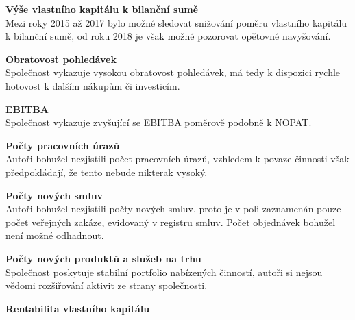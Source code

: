 \noindent\textbf{Výše vlastního kapitálu k bilanční sumě}\\

Mezi roky 2015 až 2017 bylo možné sledovat snižování poměru vlastního kapitálu k bilanční sumě, od roku 2018 je však možné pozorovat opětovné navyšování.\\

\newpage

\noindent\textbf{Obratovost pohledávek}\\

Společnost vykazuje vysokou obratovost pohledávek, má tedy k dispozici rychle hotovost k dalším nákupům či investicím.\\

\vspace*{-2mm}

\noindent\textbf{EBITBA}\\

Společnost vykazuje zvyšující se EBITBA poměrově podobně k NOPAT.\\

\vspace*{-2mm}

\noindent\textbf{Počty pracovních úrazů}\\

Autoři bohužel nezjistili počet pracovních úrazů, vzhledem k povaze činnosti však předpokládají, že tento nebude nikterak vysoký.\\

\vspace*{-2mm}

\noindent\textbf{Počty nových smluv}\\

Autoři bohužel nezjistili počty nových smluv, proto je v poli zaznamenán pouze počet veřejných zakáze, evidovaný v registru smluv. Počet objednávek bohužel není možné odhadnout.\\

\vspace*{-2mm}

\noindent\textbf{Počty nových produktů a služeb na trhu}\\

Společnost poskytuje stabilní portfolio nabízených činností, autoři si nejsou vědomi rozšiřování aktivit ze strany společnosti.\\

\vspace*{-2mm}

\noindent\textbf{Rentabilita vlastního kapitálu}\\

